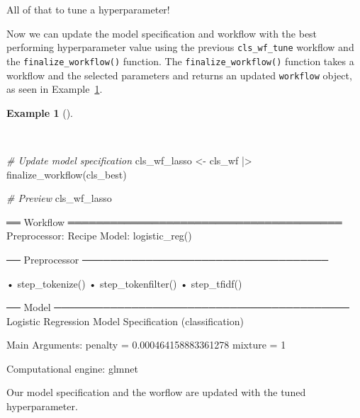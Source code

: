 \documentclass[
  letterpaper,
]{latex/krantz}
\newenvironment{Shaded}{\begin{snugshade}}{\end{snugshade}}
\newcommand{\CommentTok}[1]{\textcolor[rgb]{0.00,0.00,0.00}{\textit{#1}}}
\newcommand{\FunctionTok}[1]{\textcolor[rgb]{0.00,0.00,0.00}{#1}}
\newcommand{\NormalTok}[1]{\textcolor[rgb]{0.00,0.00,0.00}{#1}}
\newcommand{\OtherTok}[1]{\textcolor[rgb]{0.00,0.00,0.00}{#1}}
\newcommand{\SpecialCharTok}[1]{\textcolor[rgb]{0.00,0.00,0.00}{#1}}
\theoremstyle{definition}
\newtheorem{example}{Example}[chapter]
\theoremstyle{remark}
\begin{document}
All of that to tune a hyperparameter!

Now we can update the model specification and workflow with the best
performing hyperparameter value using the previous
\texttt{cls\_wf\_tune} workflow and the \texttt{finalize\_workflow()}
function. The \texttt{finalize\_workflow()} function takes a workflow
and the selected parameters and returns an updated \texttt{workflow}
object, as seen in
Example~\ref{exm-predict-class-tune-hyperparameters-update-workflow}.

\begin{example}[]\protect\hypertarget{exm-predict-class-tune-hyperparameters-update-workflow}{}\label{exm-predict-class-tune-hyperparameters-update-workflow}

~

\begin{Shaded}
\begin{Highlighting}[]
\CommentTok{\# Update model specification}
\NormalTok{cls\_wf\_lasso }\OtherTok{\textless{}{-}}
\NormalTok{  cls\_wf }\SpecialCharTok{|\textgreater{}}
  \FunctionTok{finalize\_workflow}\NormalTok{(cls\_best)}

\CommentTok{\# Preview}
\NormalTok{cls\_wf\_lasso}
\end{Highlighting}
\end{Shaded}

\begin{Shaded}
\begin{Highlighting}[]
\NormalTok{══ Workflow ═══════════════════════════════════════}
\NormalTok{Preprocessor: Recipe}
\NormalTok{Model: logistic\_reg()}

\NormalTok{── Preprocessor ───────────────────────────────────}

\NormalTok{• step\_tokenize()}
\NormalTok{• step\_tokenfilter()}
\NormalTok{• step\_tfidf()}

\NormalTok{── Model ──────────────────────────────────────────}
\NormalTok{Logistic Regression Model Specification (classification)}

\NormalTok{Main Arguments:}
\NormalTok{  penalty = 0.000464158883361278}
\NormalTok{  mixture = 1}

\NormalTok{Computational engine: glmnet}
\end{Highlighting}
\end{Shaded}

\end{example}

Our model specification and the worflow are updated with the tuned
hyperparameter.
\end{document}
